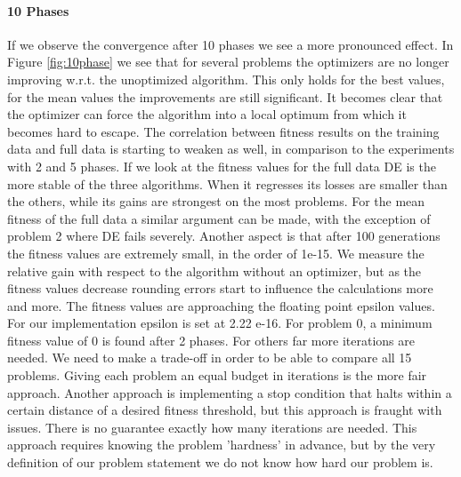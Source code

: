 \paragraph{10 Phases}
If we observe the convergence after 10 phases we see a more pronounced effect. In Figure \ref{fig:10phase} we see that for several problems the optimizers are no longer improving w.r.t. the unoptimized algorithm. This only holds for the best values, for the mean values the improvements are still significant. It becomes clear that the optimizer can force the algorithm into a local optimum from which it becomes hard to escape. The correlation between fitness results on the training data and full data is starting to weaken as well, in comparison to the experiments with 2 and 5 phases. 
If we look at the fitness values for the full data DE is the more stable of the three algorithms. When it regresses its losses are smaller than the others, while its gains are strongest on the most problems. For the mean fitness of the full data a similar argument can be made, with the exception of problem 2 where DE fails severely.
Another aspect is that after 100 generations the fitness values are extremely small, in the order of 1e-15. We measure the relative gain with respect to the algorithm without an optimizer, but as the fitness values decrease rounding errors start to influence the calculations more and more. The fitness values are approaching the floating point epsilon values. For our implementation epsilon is set at 2.22 e-16. For problem 0, a minimum fitness value of 0 is found after 2 phases. For others far more iterations are needed. We need to make a trade-off in order to be able to compare all 15 problems. Giving each problem an equal budget in iterations is the more fair approach. Another approach is implementing a stop condition that halts within a certain distance of a desired fitness threshold, but this approach is fraught with issues. There is no guarantee exactly how many iterations are needed. This approach requires knowing the problem 'hardness' \cite{GPHardness} in advance, but by the very definition of our problem statement we do not know how hard our problem is. 